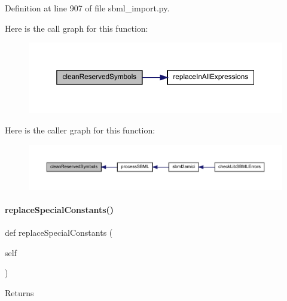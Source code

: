 Definition at line 907 of file sbml\+\_\+import.\+py.

Here is the call graph for this function\+:
\nopagebreak
\begin{figure}[H]
\begin{center}
\leavevmode
\includegraphics[width=350pt]{classamici_1_1sbml__import_1_1_sbml_importer_a122b9921e2fb5bd0fc75310c47413dd1_cgraph}
\end{center}
\end{figure}
Here is the caller graph for this function\+:
\nopagebreak
\begin{figure}[H]
\begin{center}
\leavevmode
\includegraphics[width=350pt]{classamici_1_1sbml__import_1_1_sbml_importer_a122b9921e2fb5bd0fc75310c47413dd1_icgraph}
\end{center}
\end{figure}
\mbox{\label{classamici_1_1sbml__import_1_1_sbml_importer_a5348e7b5041334f8c54b45c5c928dea0}} 
\paragraph{\texorpdfstring{replace\+Special\+Constants()}{replaceSpecialConstants()}}
{\footnotesize\ttfamily def replace\+Special\+Constants (\begin{DoxyParamCaption}\item[{}]{self }\end{DoxyParamCaption})}

\begin{DoxyReturn}{Returns}

\end{DoxyReturn}


